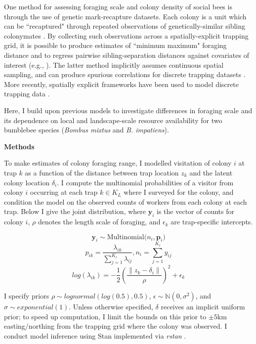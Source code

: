 \documentclass[11pt]{article}
\begin{document}
One method for assessing foraging scale and colony density of social bees is through the use of genetic mark-recapture datasets. Each colony is a unit which can be ``recaptured" through repeated observations of genetically-similar sibling colonymates \parencite{chapman_genetic_2003}. By collecting such observations across a spatially-explicit trapping grid, it is possible to produce estimates of ``minimum maximum" foraging distance and to regress pairwise sibling-separation distances against covariates of interest (e.g., \textcite{jha_resource_2013}). The latter method implicitly assumes continuous spatial sampling, and can produce spurious correlations for discrete trapping datasets \parencite{pope_inferring_2017}. More recently, spatially explicit frameworks have been used to model discrete trapping data \parencite{pope_seasonal_2018}.

Here, I build upon previous models to investigate differences in foraging scale and its dependence on local and landscape-scale resource availability for two bumblebee species (\emph{Bombus mixtus} and \emph{B. impatiens}).
 
\noindent \textbf{Methods}

To make estimates of colony foraging range, I modelled visitation of colony $i$ at trap $k$ as a function of the distance between trap location $z_k$ and the latent colony location $\delta_i$. I compute the multinomial probabilities of a visitor from colony $i$ occurring at each trap $k \in K_L$ where I surveyed for the colony, and condition the model on the observed counts of workers from each colony at each trap. Below I give the joint distribution, where $\mathbf{y}_i$ is the vector of counts for colony $i$, $\rho$ denotes the length scale of foraging, and $\epsilon_k$ are trap-specific intercepts.

\[
\mathbf{y}_i \sim \text{Multinomial}\big(n_i, \mathbf{p}_i \big)
\]
\[
p_{ik} = \frac{\lambda_{ik}}{\sum_{j=1}^{K_l} \lambda_{ij}}, 
    n_i = \sum_{j=1}^{K_l} y_{ij}
\]
\[
log(\lambda_{ik}) = -\frac{1}{2}\left(\frac{\lVert z_k - \delta_i \rVert}{\rho}\right)^2 + \epsilon_k
\]

\noindent I specify priors $\rho \sim lognormal(log(0.5), 0.5)$, $\epsilon \sim \mathbb{N}(0, \sigma^2)$, and $\sigma \sim exponential(1)$.  Unless otherwise specified, $\delta$ receives an implicit uniform prior; to speed up computation, I limit the bounds on this prior to $\pm 5$km easting/northing from the trapping grid where the colony was observed. I conduct model inference using Stan \parencite{carpenter_stan_2017} implemented via \emph{rstan} \parencite{rstan}. 
\end{document}

